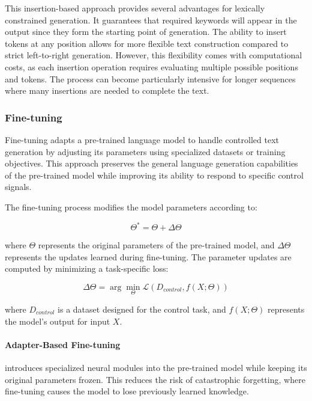 This insertion-based approach provides several advantages for lexically constrained generation. It guarantees that required keywords will appear in the output since they form the starting point of generation. The ability to insert tokens at any position allows for more flexible text construction compared to strict left-to-right generation. However, this flexibility comes with computational costs, as each insertion operation requires evaluating multiple possible positions and tokens. The process can become particularly intensive for longer sequences where many insertions are needed to complete the text.

\subsubsection{Fine-tuning}

Fine-tuning adapts a pre-trained language model to handle controlled text generation by adjusting its parameters using specialized datasets or training objectives. 
This approach preserves the general language generation capabilities of the pre-trained model while improving its ability to respond to specific control signals.

The fine-tuning process modifies the model parameters according to:

\begin{equation}
    \Theta^* = \Theta + \Delta\Theta
\end{equation}

where $\Theta$ represents the original parameters of the pre-trained model, and $\Delta\Theta$ represents the updates learned during fine-tuning. The parameter updates are computed by minimizing a task-specific loss:

\begin{equation}
    \Delta\Theta = \arg\min_{\Theta} \mathcal{L}(D_{control}, f(X; \Theta))
\end{equation}

where $D_{control}$ is a dataset designed for the control task, and $f(X; \Theta)$ represents the model's output for input $X$.

\paragraph{Adapter-Based Fine-tuning}
introduces specialized neural modules into the pre-trained model while keeping its original parameters frozen. This reduces the risk of catastrophic forgetting, where fine-tuning causes the model to lose previously learned knowledge.

